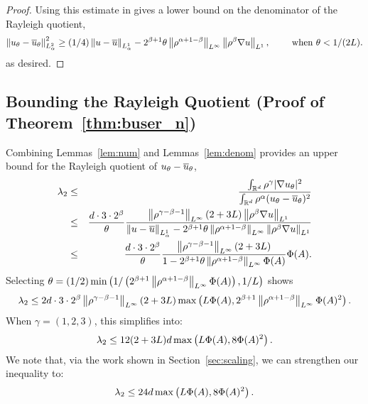\begin{proof}
  Using this estimate in  gives a lower bound on the
  denominator of the Rayleigh quotient,
  \begin{align}
  \left\lVert u_\theta - {\overline{u}}_\theta \right\rVert_{L^2_\alpha}^2
  \geq (1/4) \left\lVert u-{\overline{u}} \right\rVert_{L^1_\alpha} 
  - 2^{\beta+1} \theta \left\lVert \rho^{\alpha+1-\beta} \right\rVert_{{L^\infty}} \left\lVert \rho^\beta \nabla u \right\rVert_{L^1},
  \qquad \text{ when } \theta < 1 / (2L).
  \end{align}
  as desired.
  \end{proof}

  \subsection{Bounding the Rayleigh
    Quotient (Proof of Theorem~\ref{thm:buser_n})}\label{sec:rayleigh-bound}
  Combining Lemmas~\ref{lem:num} and Lemmas~\ref{lem:denom}
  provides an upper bound for the Rayleigh quotient of $u_\theta - {\overline{u}}_\theta$,
  \begin{eqnarray*}
    \lambda_2 
    &\leq& \frac{\int_{\mathbb{R}^d} \rho^\gamma |\nabla u_\theta|^2}
    {\int_{\mathbb{R}^d} \rho^\alpha (u_\theta - {\overline{u}}_\theta)^2} \\
    &\leq&  \frac{d \cdot 3 \cdot 2^{\beta}}{\theta}
    \frac{\left\lVert \rho^{\gamma-\beta-1} \right\rVert_{{L^\infty}} (2+3L) \left\lVert \rho^\beta \nabla u \right\rVert_{L^1}}
    {\left\lVert u-{\overline{u}} \right\rVert_{L^1_\alpha} 
      - 2^{\beta+1} \theta \left\lVert \rho^{\alpha+1-\beta} \right\rVert_{{L^\infty}} \left\lVert \rho^\beta \nabla u \right\rVert_{L^1}} \\
    &\leq&  \frac{d \cdot 3 \cdot 2^{\beta}}{\theta}
    \frac{\left\lVert \rho^{\gamma-\beta-1} \right\rVert_{{L^\infty}} (2+3L)}
    {1 - 2^{\beta + 1} \theta \left\lVert \rho^{\alpha+1-\beta} \right\rVert_{{L^\infty}} \Phi(A)} \Phi(A).
  \end{eqnarray*}
  Selecting $\theta = (1/2)
  \min\left(1/\left(2^{\beta+1}\left\lVert \rho^{\alpha+1-\beta} \right\rVert_{{L^\infty}}
        \Phi(A)\right), 1/L
  \right)$ shows
  \[
  \lambda_2 \leq 2 d \cdot 3 \cdot 2^{\beta}
\linf{\rho^{\gamma-\beta-1}}(2+3L) 
  \max\left(L \Phi(A), 2^{\beta+1}\linf{\rho^{\alpha+1-\beta}} \Phi(A)^2 \vph\right).
  \]
  When $\gamma = (1,2,3)$, this simplifies into:
  \[
  \lambda_2 \leq 12(2+3L) d
  \max\left(L \Phi(A), 8 \Phi(A)^2 \vph\right).
  \]
  We note that, via the work shown in
  Section~\ref{sec:scaling},  we can strengthen our inequality
  to:
  \[
  \lambda_2 \leq 24 d
  \max\left(L \Phi(A), 8 \Phi(A)^2 \vph\right).
  \]

  \qedhere
